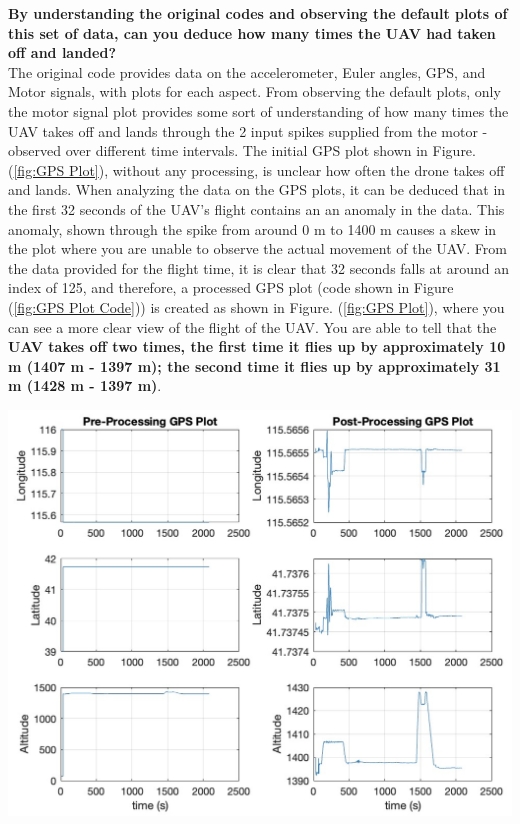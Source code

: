 \textbf{By understanding the original codes and observing the default plots of this set of data, can you deduce how many times the UAV had taken off and landed?}
\\

The original code provides data on the accelerometer, Euler angles, GPS, and Motor signals, with plots for each aspect. From observing the default plots, only the motor signal plot provides some sort of understanding of how many times the UAV takes off and lands through the 2 input spikes supplied from the motor - observed over different time intervals. The initial GPS plot shown in Figure. (\ref{fig:GPS Plot}), without any processing, is unclear how often the drone takes off and lands. When analyzing the data on the GPS plots, it can be deduced that in the first 32 seconds of the UAV's flight contains an an anomaly in the data. This anomaly, shown through the spike from around 0 m to 1400 m causes a skew in the plot where you are unable to observe the actual movement of the UAV. From the data provided for the flight time, it is clear that 32 seconds falls at around an index of 125, and therefore, a processed GPS plot (code shown in Figure (\ref{fig:GPS Plot Code})) is created as shown in Figure. (\ref{fig:GPS Plot}), where you can see a more clear view of the flight of the UAV. You are able to tell that the \textbf{UAV takes off two times, the first time it flies up by approximately 10 m (1407 m - 1397 m); the second time it flies up by approximately 31 m (1428 m - 1397 m)}.
\\
\begin{minipage}[H]{0.43\textwidth}
    \centering
    \includegraphics[width=1.6\linewidth]{Introduction/GPS_Plot.png}  
    \label{fig:GPS Plot}
    \captionsetup{justification=centering} %
\end{minipage}
